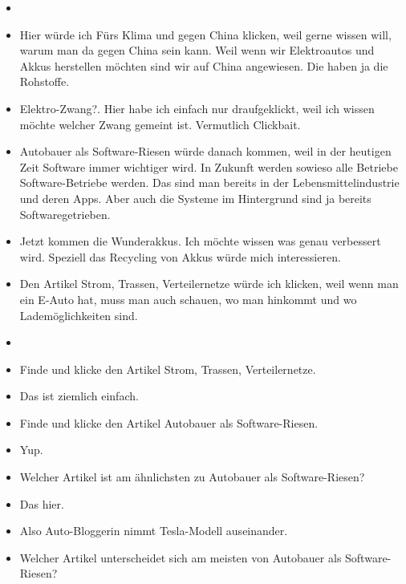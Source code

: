 {\begin{itemize}[]
            \item {}
            \item {} Hier würde ich \flqq Fürs Klima und gegen China\frqq{} klicken, weil gerne wissen will, warum man da gegen China sein kann.
                  Weil wenn wir Elektroautos und Akkus herstellen möchten sind wir auf China angewiesen.
                  Die haben ja die Rohstoffe.
            \item {} \flqq Elektro-Zwang?\frqq{}.
                  Hier habe ich einfach nur draufgeklickt, weil ich wissen möchte welcher Zwang gemeint ist.
                  Vermutlich Clickbait.
            \item {} \flqq Autobauer als Software-Riesen\frqq{} würde danach kommen, weil in der heutigen Zeit Software immer wichtiger wird.
                  In Zukunft werden sowieso alle Betriebe Software-Betriebe werden.
                  Das sind man bereits in der Lebensmittelindustrie und deren Apps.
                  Aber auch die Systeme im Hintergrund sind ja bereits Softwaregetrieben.
            \item {} \flqq Jetzt kommen die Wunderakkus\frqq{}.
                  Ich möchte wissen was genau verbessert wird.
                  Speziell das Recycling von Akkus würde mich interessieren.
            \item {} Den Artikel \flqq Strom, Trassen, Verteilernetze\frqq{} würde ich klicken, weil wenn man ein E-Auto hat, muss man auch schauen, wo man hinkommt und wo Lademöglichkeiten sind.
            \item {}
            \item {} Finde und klicke den Artikel \flqq Strom, Trassen, Verteilernetze\frqq{}.
            \item {} Das ist ziemlich einfach.
            \item {} Finde und klicke den Artikel \flqq Autobauer als Software-Riesen\frqq{}.
            \item {} Yup.
            \item {} Welcher Artikel ist am ähnlichsten zu \flqq Autobauer als Software-Riesen\frqq{}?
            \item {} Das hier.
            \item {} Also \flqq Auto-Bloggerin nimmt Tesla-Modell auseinander\frqq{}.
            \item {} Welcher Artikel unterscheidet sich am meisten von \flqq Autobauer als Software-Riesen\frqq{}?

\end{itemize}}

